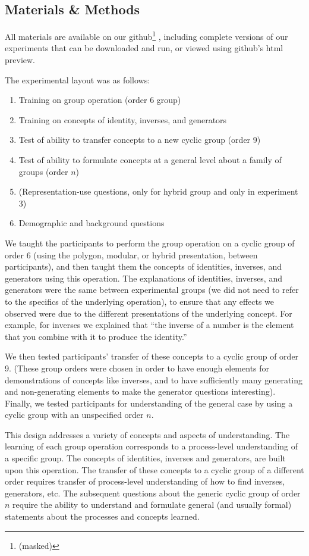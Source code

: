 \documentclass[man,mask,10pt]{apa6}
\begin{document}
\subsection{Materials \& Methods} 
All materials are available on our github\footnote{(masked)}%
, including complete versions of our experiments that can be downloaded and run, or viewed using github's html preview. \par
The experimental layout was as follows:
\begin{enumerate}
\item Training on group operation (order 6 group)
\item Training on concepts of identity, inverses, and generators
\item Test of ability to transfer concepts to a new cyclic group (order 9)
\item Test of ability to formulate concepts at a general level about a family of groups (order $n$)
\item (Representation-use questions, only for hybrid group and only in experiment 3)
\item Demographic and background questions
\end{enumerate}
We taught the participants to perform the group operation on a cyclic group of order 6 (using the polygon, modular, or hybrid presentation, between participants), and then taught them the concepts of identities, inverses, and generators using this operation. The explanations of identities, inverses, and generators were the same between experimental groups (we did not need to refer to the specifics of the underlying operation), to ensure that any effects we observed were due to the different presentations of the underlying concept. For example, for inverses we explained that ``the inverse of a number is the element that you combine with it to produce the identity.''\par
We then tested participants' transfer of these concepts to a cyclic group of order 9. (These group orders were chosen in order to have enough elements for demonstrations of concepts like inverses, and to have sufficiently many generating and non-generating elements to make the generator questions interesting). Finally, we tested participants for understanding of the general case by using a cyclic group with an unspecified order $n$. \par
This design addresses a variety of concepts and aspects of understanding. The learning of each group operation corresponds to a process-level understanding of a specific group. The concepts of identities, inverses and generators, are built upon this operation. The transfer of these concepts to a cyclic group of a different order requires transfer of process-level understanding of how to find inverses, generators, etc. The subsequent questions about the generic cyclic group of order $n$ require the ability to understand and formulate general (and usually formal) statements about the processes and concepts learned. 
\end{document}
